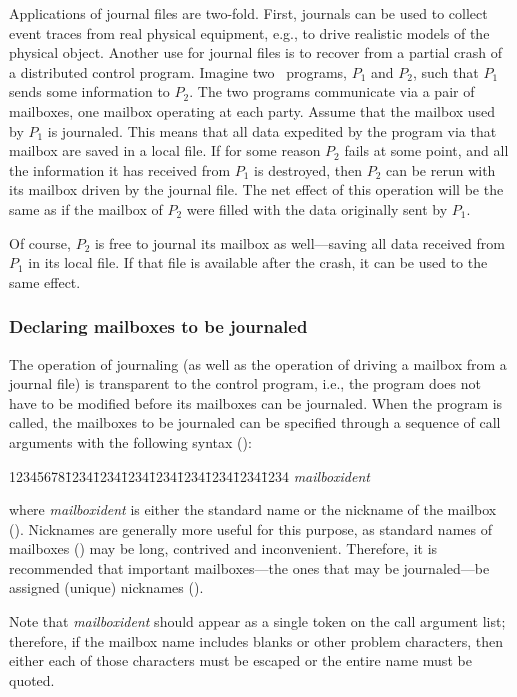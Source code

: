 Applications of journal files are two-fold.
First, journals
can be used to collect event traces from real physical equipment, e.g.,
to drive realistic models of the physical object.
Another use for journal files is to recover from a
partial crash of a distributed control program.
Imagine two \smurph\ programs,
$P_1$ and $P_2$,
such that
$P_1$
sends some information to
$P_2$.
The two programs communicate via a pair of mailboxes, one mailbox
operating at each party.
Assume that the mailbox used by
$P_1$
is journaled.
This means that all data expedited by the program via that mailbox are
saved in a local file.
If for some reason
$P_2$
fails at some point, and all
the information it has received from
$P_1$
is destroyed,
then
$P_2$
can be rerun with its mailbox driven by
the journal file.
The net effect of this operation will be the same as if the mailbox of
$P_2$
were filled with the data originally sent by
$P_1$.

Of course,
$P_2$
is free to journal its mailbox as well---saving
all data received from
$P_1$
in its local file.
If that file is available after the crash, it can be used to the same
effect.

\subsubsection{Declaring mailboxes to be journaled}
\label{rm_mb_ju_dm}

The operation of journaling (as well as the operation of driving a mailbox
from a journal file) is transparent to the control program, i.e., the
program does not have to be modified before its mailboxes can be journaled.
When the program is called, the mailboxes to be journaled can be specified
through a sequence of call arguments with the following syntax
():
{\tt\begin{tabbing}
12345678\=1234\=1234\=1234\=1234\=1234\=1234\=1234\=1234\kill
{} {\em mailboxident\/}
\end{tabbing}}
where {\em mailboxident\/} is either the standard name or the nickname
of the mailbox ().
Nicknames are generally more useful for this purpose, as standard names of
mailboxes () may be long, contrived and inconvenient.
Therefore, it is recommended that important mailboxes---the ones
that may be journaled---be assigned (unique) nicknames ().

Note that {\em mailboxident\/} should appear as a single token on the call
argument list; therefore, if the mailbox name includes blanks or other
problem characters, then either each of those characters must be escaped or
the entire name must be quoted.

